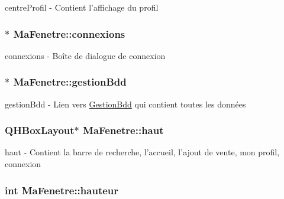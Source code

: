 centre\-Profil -\/ Contient l'affichage du profil 

\hypertarget{class_ma_fenetre_a3c115601ad85a01422813dcdf48eb44d}{
\subsubsection[{connexions}]{$\ast$ Ma\-Fenetre\-::connexions\hspace{0.3cm}{\ttfamily [protected]}}}\label{class_ma_fenetre_a3c115601ad85a01422813dcdf48eb44d}


connexions -\/ Boîte de dialogue de connexion 

\hypertarget{class_ma_fenetre_a34d71a96cedb508c72afb02c70ff9609}{
\subsubsection[{gestion\-Bdd}]{$\ast$ Ma\-Fenetre\-::gestion\-Bdd\hspace{0.3cm}{\ttfamily [protected]}}}\label{class_ma_fenetre_a34d71a96cedb508c72afb02c70ff9609}


gestion\-Bdd -\/ Lien vers \hyperlink{class_gestion_bdd}{Gestion\-Bdd} qui contient toutes les données 

\hypertarget{class_ma_fenetre_acd485d3f85c155925df773f028f9e537}{
\subsubsection[{haut}]{\setlength{\rightskip}{0pt plus 5cm}Q\-H\-Box\-Layout$\ast$ Ma\-Fenetre\-::haut\hspace{0.3cm}{\ttfamily [protected]}}}\label{class_ma_fenetre_acd485d3f85c155925df773f028f9e537}


haut -\/ Contient la barre de recherche, l'accueil, l'ajout de vente, mon profil, connexion 

\hypertarget{class_ma_fenetre_ae1a802d46705239d08d3bf06cd99b802}{
\subsubsection[{hauteur}]{\setlength{\rightskip}{0pt plus 5cm}int Ma\-Fenetre\-::hauteur\hspace{0.3cm}{\ttfamily [protected]}}}\label{class_ma_fenetre_ae1a802d46705239d08d3bf06cd99b802}


